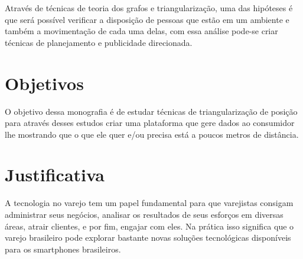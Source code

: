 Através de técnicas de teoria dos grafos e triangularização, uma das hipóteses é que será possível verificar a disposição de pessoas que estão em um ambiente e também a movimentação de cada uma delas, com essa análise pode-se criar técnicas de planejamento e publicidade direcionada. 

\section{Objetivos} 

O objetivo dessa monografia é de estudar técnicas de triangularização de posição para através desses estudos criar uma plataforma que gere dados ao consumidor lhe mostrando que o que ele quer e/ou precisa está a poucos metros de distância.

\section{Justificativa} 

A tecnologia no varejo tem um papel fundamental para que varejistas consigam administrar seus negócios, analisar os resultados de seus esforços em diversas áreas, atrair clientes, e por fim, engajar com eles. Na prática isso significa que o varejo brasileiro pode explorar bastante novas soluções tecnológicas disponíveis para os smartphones brasileiros.

